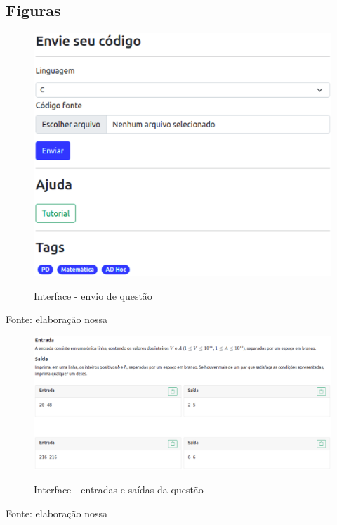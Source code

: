 \begin{apendicesenv}

\partapendices

\chapter{Figuras}
\label{appendix:a}

\begin{figure}[H]
    \centering
    \caption{Interface - envio de questão}
    \includegraphics[keepaspectratio=true,scale=0.5]{figuras/sendQuestion1.eps}
    \label{fig:sendQuestion1}
\end{figure}
\begin{center}
    {\tiny Fonte: elaboração nossa}
\end{center}
    
\begin{figure}[H]
    \centering
    \caption{Interface - entradas e saídas da questão}
    \includegraphics[keepaspectratio=true,scale=0.35]{figuras/questionInputs.eps}
    \label{fig:questionInputs}
\end{figure}
\begin{center}
    {\tiny Fonte: elaboração nossa}
\end{center}


\end{apendicesenv}
